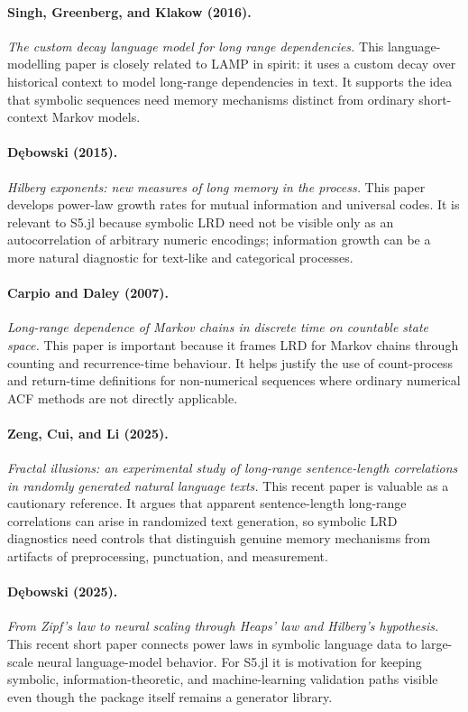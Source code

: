 \documentclass[11pt]{article}
\begin{document}
\paragraph{Singh, Greenberg, and Klakow (2016).}
\emph{The custom decay language model for long range dependencies.}
This language-modelling paper is closely related to LAMP in spirit: it uses a
custom decay over historical context to model long-range dependencies in text.
It supports the idea that symbolic sequences need memory mechanisms distinct
from ordinary short-context Markov models.

\paragraph{Dębowski (2015).}
\emph{Hilberg exponents: new measures of long memory in the process.}
This paper develops power-law growth rates for mutual information and universal
codes. It is relevant to S5.jl because symbolic LRD need not be visible only as
an autocorrelation of arbitrary numeric encodings; information growth can be a
more natural diagnostic for text-like and categorical processes.

\paragraph{Carpio and Daley (2007).}
\emph{Long-range dependence of Markov chains in discrete time on countable state
space.}
This paper is important because it frames LRD for Markov chains through counting
and recurrence-time behaviour. It helps justify the use of count-process and
return-time definitions for non-numerical sequences where ordinary numerical ACF
methods are not directly applicable.

\paragraph{Zeng, Cui, and Li (2025).}
\emph{Fractal illusions: an experimental study of long-range sentence-length
correlations in randomly generated natural language texts.}
This recent paper is valuable as a cautionary reference. It argues that apparent
sentence-length long-range correlations can arise in randomized text generation,
so symbolic LRD diagnostics need controls that distinguish genuine memory
mechanisms from artifacts of preprocessing, punctuation, and measurement.

\paragraph{Dębowski (2025).}
\emph{From Zipf's law to neural scaling through Heaps' law and Hilberg's
hypothesis.}
This recent short paper connects power laws in symbolic language data to
large-scale neural language-model behavior. For S5.jl it is motivation for
keeping symbolic, information-theoretic, and machine-learning validation paths
visible even though the package itself remains a generator library.
\end{document}
